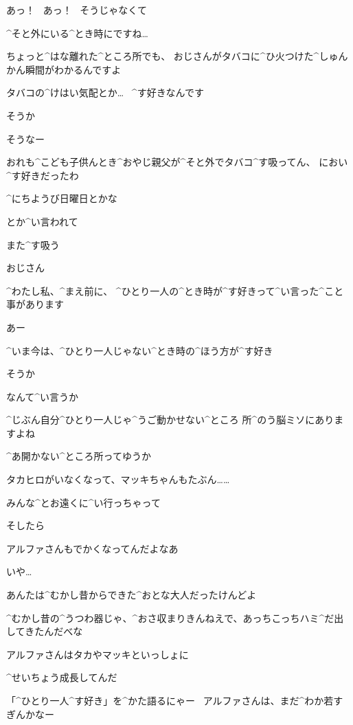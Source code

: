 \Alpha あっ！
\ あっ！
\ そうじゃなくて

\Alpha ^{そと}{外}にいる^{とき}{時}にですね…

\Alpha ちょっと^{はな}{離}れた^{ところ}{所}でも、
おじさんがタバコに^{ひ}{火}つけた^{しゅんかん}{瞬間}がわかるんですよ

\Alpha タバコの^{けはい}{気配}とか…
\ ^{す}{好}きなんです

\page
\Ojisan そうか

\Ojisan そうなー

\Ojisan おれも^{こども}{子供}んとき^{おやじ}{親父}が^{そと}{外}でタバコ^{す}{吸}ってん、
におい^{す}{好}きだったわ

\Ojisan ^{にちようび}{日曜日}とかな

\page
\Ojisan とか^{い}{言}われて

\Ojisan また^{す}{吸}う

\Alpha おじさん

\Alpha ^{わたし}{私}、^{まえ}{前}に、
^{ひとり}{一人}の^{とき}{時}が^{す}{好}きって^{い}{言}った^{こと}{事}があります

\Ojisan あー

\Alpha ^{いま}{今}は、^{ひとり}{一人}じゃない^{とき}{時}の^{ほう}{方}が^{す}{好}き

\page
\Ojisan そうか

\Alpha なんて^{い}{言}うか

\Alpha ^{じぶん}{自分}^{ひとり}{一人}じゃ^{うご}{動}かせない^{ところ }{所}^{のう}{脳}ミソにありますよね

\Alpha ^{あ}{開}かない^{ところ}{所}ってゆうか

\Alpha タカヒロがいなくなって、マッキちゃんもたぶん……

\Alpha みんな^{とお}{遠}くに^{い}{行}っちゃって

\page
\Alpha そしたら

\Ojisan アルファさんもでかくなってんだよなあ

\page
\Ojisan いや…

\Ojisan あんたは^{むかし}{昔}からできた^{おとな}{大人}だったけんどよ

\Ojisan ^{むかし}{昔}の^{うつわ}{器}じゃ、^{おさ}{収}まりきんねえで、あっちこっちハミ^{だ}{出}してきたんだべな

\Ojisan アルファさんはタカやマッキといっしょに

\Ojisan ^{せいちょう}{成長}してんだ

\Ojisan 「^{ひとり}{一人}^{す}{好}き」を^{かた}{語}るにゃー
\ アルファさんは、まだ^{わか}{若}すぎんかなー

